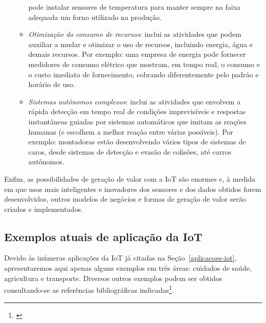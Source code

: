 \documentclass[pdftex, brazil, 12pt, twoside]{article}
\begin{document}
\begin{itemize}
\begin{itemize}
    pode instalar sensores de temperatura para manter sempre na faixa adequada
    um forno utilizado na produção.
  \item \emph{Otimização do consumo de recursos}: inclui as atividades que podem
    auxiliar a mudar e otimizar o uso de recursos, incluindo energia, água e
    demais recursos. Por exemplo: uma empresa de energia pode fornecer medidores
    de consumo elétrico que mostram, em tempo real, o consumo e o custo imediato
    de fornecimento, cobrando diferentemente pelo padrão e horário de uso.
  \item \emph{Sistemas autônomos complexos}: inclui as atividades que envolvem
    a rápida detecção em tempo real de condições imprevisíveis e respostas
    instantâneas guiadas por sistemas automáticos que imitam as reações humanas
    (e escolhem a melhor reação entre várias possíveis). Por exemplo: montadoras
    estão desenvolvendo vários tipos de sistemas de caros, desde sistemas de
    detecção e evasão de colisões, até carros autônomos.
  \end{itemize}
\end{itemize}

Enfim, as possibilidades de geração de valor com a IoT são enormes e, à medida
em que usos mais inteligentes e inovadores dos sensores e dos dados obtidos forem
desenvolvidos, outros modelos de negócios e formas de geração de valor serão
criados e implementados.


\subsection{Exemplos atuais de aplicação da IoT}
\label{aplicacoes-iot-exemplos}

Devido às inúmeras aplicações da IoT já citadas na Seção~\ref{aplicacoes-iot},
apresentaremos aqui apenas alguns exemplos em três áreas: cuidados de saúde,
agricultura e transporte. Diversos outros exemplos podem ser obtidos consultando-se
as referências bibliográficas indicadas\footnote{\citet{OliverWymanIoT2015,UKGOSWalportIoT2014,IEEEIoTReport,IEEEIoTDefinition,ChuiIoT2010,BughinExecutiveIoT2015,GuptaMcKinseyIoT2017,McKinseyIoTHype,SAPFutureIoT,SASIoTUseCases2016,MorganStanleyIoTnow2013,AlaskaIoTComm2015,BackDeckerIoT2014,MazakIoT2016,CopenhagenIoT2013,KansasIoT2016,RockwellIoT2016,MississaugaIoT2015}}.


\end{document}
